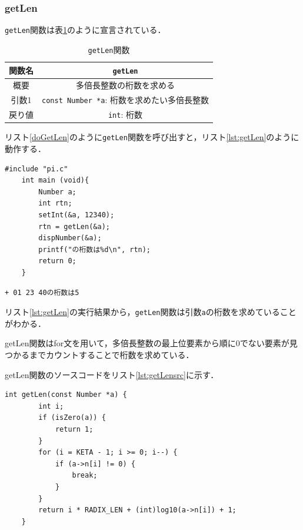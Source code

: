 \documentclass[a4paper,11pt,dvipdfmx]{jsarticle}
\begin{document}
\subsubsection{getLen}
\texttt{getLen}関数は表\ref{table:lst:getLen}のように宣言されている．

\begin{table}[H]
\centering
\caption{\texttt{getLen}関数}
\label{table:lst:getLen}
\begin{tabular}{c||c}
\hline
関数名    & \texttt{getLen}   \\
\hline
概要    & 多倍長整数の桁数を求める   \\
\hline
引数1   & \texttt{const Number *a}: 桁数を求めたい多倍長整数  \\
\hline
戻り値    & \texttt{int}: 桁数   \\
\hline
\end{tabular}
\end{table}

リスト\ref{doGetLen}のように\texttt{getLen}関数を呼び出すと，リスト\ref{lst:getLen}のように動作する．

\begin{lstlisting}[caption=\texttt{getLen}関数の呼び出し,label=doGetLen]
    #include "pi.c"
    int main (void){
        Number a;
        int rtn;
        setInt(&a, 12340);
        rtn = getLen(&a);
        dispNumber(&a);
        printf("の桁数は%d\n", rtn);
        return 0;
    }
\end{lstlisting}

\begin{lstlisting}[caption=リスト\ref{doGetLen}の実行結果,label=lst:getLen]
    + 01 23 40の桁数は5
\end{lstlisting}

リスト\ref{lst:getLen}の実行結果から，\texttt{getLen}関数は引数\texttt{a}の桁数を求めていることがわかる．

getLen関数はfor文を用いて，多倍長整数の最上位要素から順に0でない要素が見つかるまでカウントすることで桁数を求めている．

getLen関数のソースコードをリスト\ref{lst:getLensrc}に示す．

\begin{lstlisting}[caption=\texttt{getLen}関数,label=lst:getLensrc]
    int getLen(const Number *a) {
        int i;
        if (isZero(a)) {
            return 1;
        }
        for (i = KETA - 1; i >= 0; i--) {
            if (a->n[i] != 0) {
                break;
            }
        }
        return i * RADIX_LEN + (int)log10(a->n[i]) + 1;
    }
\end{lstlisting}
\end{document}
